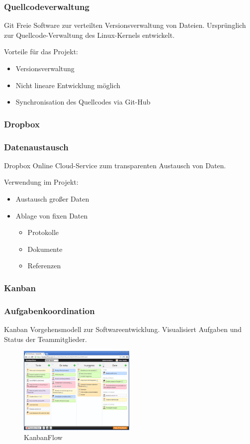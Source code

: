 \begin{frame} 
  \frametitle{Quellcodeverwaltung}
  \begin{block}{Git}
   Freie Software zur verteilten Versionsverwaltung von Dateien. 
   Ursprünglich zur Quellcode-Verwaltung des Linux-Kernels entwickelt.
  \end{block}
  Vorteile für das Projekt:
    \begin{itemize}
      \item Versionsverwaltung
      \item Nicht lineare Entwicklung möglich
      \item Synchronisation des Quellcodes via Git-Hub
    \end{itemize}
\end{frame}

\subsubsection{Dropbox}
\begin{frame} 
  \frametitle{Datenaustausch}
  \begin{block}{Dropbox}
    Online Cloud-Service zum transparenten Austausch von Daten.
  \end{block}
  Verwendung im Projekt:
    \begin{itemize}
      \item Austausch großer Daten
      \item Ablage von fixen Daten
      \begin{itemize}
        \item Protokolle
        \item Dokumente
        \item Referenzen
      \end{itemize}
    \end{itemize}
\end{frame}

\subsubsection{Kanban}

\begin{frame} 
  \frametitle{Aufgabenkoordination}
  \begin{block}{Kanban}
     Vorgehensmodell zur Softwareentwicklung.
     Visualisiert Aufgaben und Status der Teammitglieder.
  \end{block}
    \begin{figure}[htbp]
      \centering
        \includegraphics[width=0.5\textwidth]{./chapters/Kanban.png}
        \caption{KanbanFlow}
        \label{fig:Kanban}
   \end{figure}
\end{frame}


